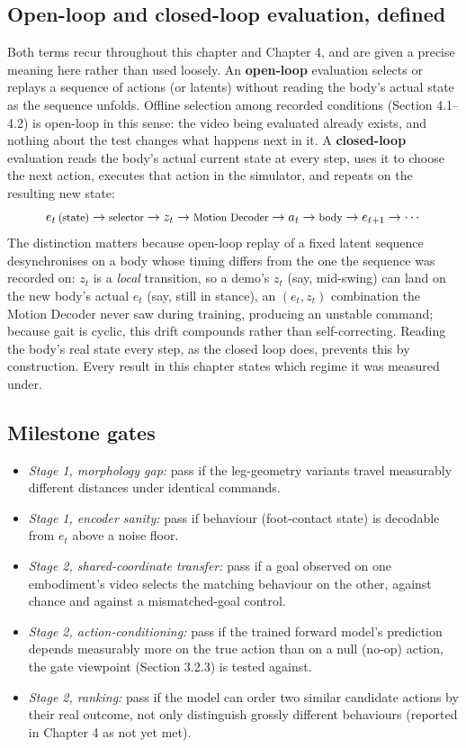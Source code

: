 \documentclass[12pt,a4paper,oneside]{report}
\begin{document}
\subsection{Open-loop and closed-loop evaluation, defined}
Both terms recur throughout this chapter and Chapter 4, and are given a precise meaning here rather than used
loosely. An \textbf{open-loop} evaluation selects or replays a sequence of actions (or latents) without reading
the body's actual state as the sequence unfolds. Offline selection among recorded conditions (Section 4.1--4.2)
is open-loop in this sense: the video being evaluated already exists, and nothing about the test changes what
happens next in it. A \textbf{closed-loop} evaluation reads the body's actual current state at every step, uses
it to choose the next action, executes that action in the simulator, and repeats on the resulting new state:
\[
\footnotesize
e_t \,\text{(state)} \to \text{selector} \to z_t \to \text{Motion Decoder} \to a_t \to \text{body} \to e_{t+1} \to \cdots
\]
The distinction matters because open-loop replay of a fixed latent sequence desynchronises on a body whose timing
differs from the one the sequence was recorded on: $z_t$ is a \emph{local} transition, so a demo's $z_t$ (say,
mid-swing) can land on the new body's actual $e_t$ (say, still in stance), an $(e_t, z_t)$ combination the Motion
Decoder never saw during training, producing an unstable command; because gait is cyclic, this drift compounds
rather than self-correcting. Reading the body's real state every step, as the closed loop does, prevents this by
construction. Every result in this chapter states which regime it was measured under.

\subsection{Milestone gates}
\begin{itemize}[label=--]
\item \emph{Stage 1, morphology gap:} pass if the leg-geometry variants travel measurably different distances
  under identical commands.
\item \emph{Stage 1, encoder sanity:} pass if behaviour (foot-contact state) is decodable from $e_t$ above a noise
  floor.
\item \emph{Stage 2, shared-coordinate transfer:} pass if a goal observed on one embodiment's video selects the
  matching behaviour on the other, against chance and against a mismatched-goal control.
\item \emph{Stage 2, action-conditioning:} pass if the trained forward model's prediction depends measurably more
  on the true action than on a null (no-op) action, the gate viewpoint (Section 3.2.3) is tested against.
\item \emph{Stage 2, ranking:} pass if the model can order two similar candidate actions by their real outcome,
  not only distinguish grossly different behaviours (reported in Chapter 4 as not yet met).
\end{itemize}
\end{document}
